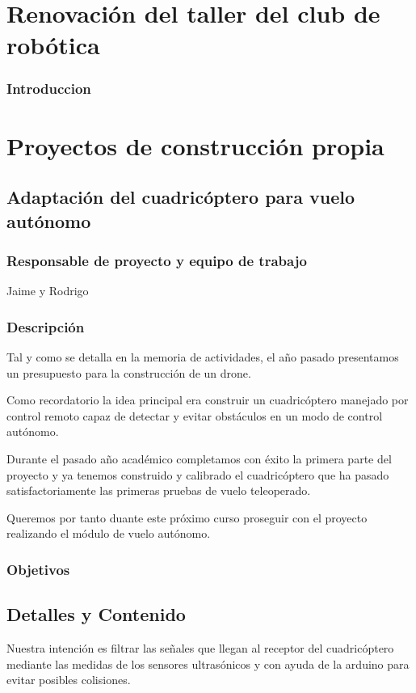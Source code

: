 \documentclass[12pt,twoside]{report}
\begin{document}
\section{Renovación del taller del club de robótica}
\subsubsection{Introduccion}

\section{Proyectos de construcción propia}

\subsection{Adaptación del cuadricóptero para vuelo autónomo}
\subsubsection{Responsable de proyecto y equipo de trabajo}
Jaime y Rodrigo
\subsubsection{Descripción}
Tal y como se detalla en la memoria de actividades, el año pasado presentamos un presupuesto para la construcción de un drone.

Como recordatorio la idea principal era construir un cuadricóptero manejado por control remoto capaz de detectar y evitar obstáculos en un modo de control autónomo.

Durante el pasado año académico completamos con éxito la primera parte del proyecto y ya tenemos construido y calibrado el cuadricóptero que ha pasado satisfactoriamente las primeras pruebas de vuelo teleoperado.

Queremos por tanto duante este próximo curso proseguir con el proyecto realizando el módulo de vuelo autónomo.

\subsubsection{Objetivos}

\subsection{Detalles y Contenido}
Nuestra intención es filtrar las señales que llegan al receptor del cuadricóptero mediante las medidas de los sensores ultrasónicos y con ayuda de la arduino para evitar posibles colisiones.
\end{document}
